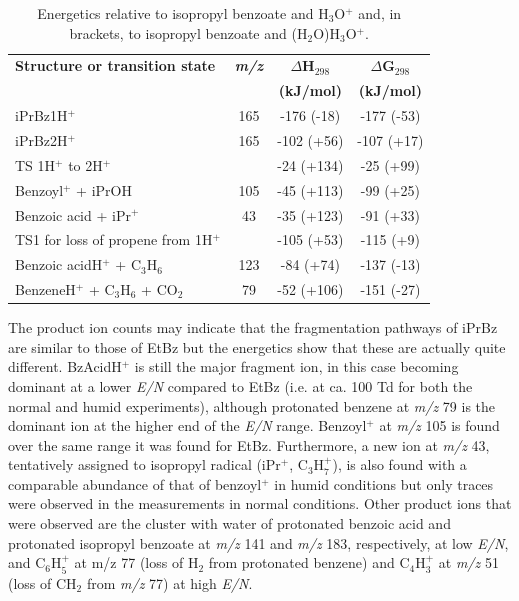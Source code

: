 \begin{table}[htbp]
\centering
\caption{Energetics relative to isopropyl benzoate and H$_3$O$^+$ and, in brackets, to isopropyl benzoate and (H$_2$O)H$_3$O$^+$. }
\label{tb:iprbz2}
\begin{tabular}{lccc}
\toprule
\textbf{Structure or transition state}	&\textbf{\textit{m/z} } &\textbf{$\Delta$H$_{298}$} &\textbf{$\Delta$G$_{298}$}\\
& &	\textbf{(kJ/mol)} &\textbf{(kJ/mol)} \\  \toprule
iPrBz1H$^+$        & 165 & -176 (-18) & -177 (-53) \\ \midrule
iPrBz2H$^+$        & 165 & -102 (+56) & -107 (+17) \\ \midrule
TS 1H$^+$ to 2H$^+$   &  & -24 (+134) & -25 (+99) \\ \midrule
Benzoyl$^+$ + iPrOH & 105 & -45 (+113) & -99 (+25) \\ \midrule
Benzoic acid + iPr$^+$ & 43 & -35 (+123) & -91 (+33) \\ \midrule
TS1 for loss of propene from 1H$^+$ &  & -105 (+53) & -115 (+9) \\ \midrule
Benzoic acidH$^+$ + C$_3$H$_6$ & 123 & -84 (+74) & -137 (-13) \\ \midrule
BenzeneH$^+$ + C$_3$H$_6$ + CO$_2$ & 79 & -52 (+106) & -151 (-27) \\
\bottomrule
\end{tabular}
\end{table}




The product ion counts may indicate that the fragmentation pathways of iPrBz are similar to those of EtBz but the energetics show that these are actually quite different.
%
BzAcidH$^+$ is still the major fragment ion, in this case becoming dominant at a lower \textit{E/N} compared to EtBz (i.e. at ca. 100 Td for both the normal and humid experiments), although protonated benzene at \textit{m/z} 79 is the dominant ion at the higher end of the \textit{E/N} range.
%
Benzoyl$^+$ at \textit{m/z} 105 is found over the same range it was found for EtBz.
%
Furthermore, a new ion at \textit{m/z} 43, tentatively assigned to isopropyl radical (iPr$^+$, C$_3$H$_7^+$), is also found with a comparable abundance of that of benzoyl$^+$ in  humid conditions but only traces were observed in the measurements in normal conditions.
%
Other product ions that were observed are
the cluster with water of protonated benzoic acid and protonated isopropyl benzoate at \textit{m/z} 141 and \textit{m/z} 183, respectively, at low \textit{E/N}, and C$_6$H$^+_5$ at m/z 77 (loss of H$_2$ from protonated benzene) and  C$_4$H$^+_3$ at \textit{m/z} 51 (loss of CH$_2$ from \textit{m/z} 77) at high \textit{E/N}.


